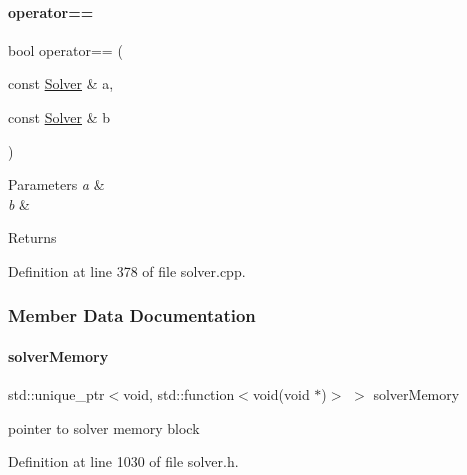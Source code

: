 \paragraph{\texorpdfstring{operator==}{operator==}}
{\footnotesize\ttfamily bool operator== (\begin{DoxyParamCaption}\item[{const \mbox{\hyperlink{classamici_1_1_solver}{Solver}} \&}]{a,  }\item[{const \mbox{\hyperlink{classamici_1_1_solver}{Solver}} \&}]{b }\end{DoxyParamCaption})\hspace{0.3cm}{\ttfamily [friend]}}


\begin{DoxyParams}{Parameters}
{\em a} & \\
\hline
{\em b} & \\
\hline
\end{DoxyParams}
\begin{DoxyReturn}{Returns}

\end{DoxyReturn}


Definition at line 378 of file solver.\+cpp.



\subsubsection{Member Data Documentation}
\mbox{\label{classamici_1_1_solver_ae002c62062f2e9dafc944c78165abcac}} 
\paragraph{\texorpdfstring{solver\+Memory}{solverMemory}}
{\footnotesize\ttfamily std\+::unique\+\_\+ptr$<$void, std\+::function$<$void(void $\ast$)$>$ $>$ solver\+Memory\hspace{0.3cm}{\ttfamily [protected]}}

pointer to solver memory block 

Definition at line 1030 of file solver.\+h.

\mbox{\label{classamici_1_1_solver_af450f49c134cba233622f7d07fc78c06}} 
